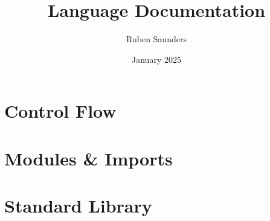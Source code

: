 \documentclass{article}
\title{Language Documentation}
\author{Ruben Saunders}
\date{January 2025}
\begin{document}
    \maketitle
    \tableofcontents

    \newpage

    

    

    

    

    

    

    \section{Control Flow}

    \section{Modules \& Imports}

    \section{Standard Library}
\end{document}
